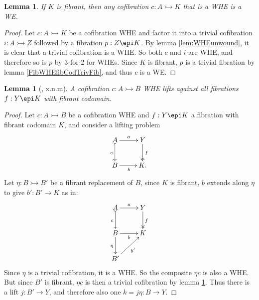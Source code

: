 \documentclass[11pt]{article}
\newcommand{\mono}{\ensuremath{\rightarrowtail}}
\newcommand{\ra}{\ensuremath{\rightarrow}}
\newtheorem{lemma}[theorem]{Lemma}
\theoremstyle{remark}
\theoremstyle{definition}
\begin{document}
\begin{lemma}\label{CofWHEfibCodTrivCof}
If $K$ is fibrant, then any cofibration $c : A \mono K$ that is a WHE is a WE.
\end{lemma}
\begin{proof}
Let $c : A \mono K$ be a cofibration WHE and factor it into a trivial cofibration $i : A\mono Z$ followed by a fibration $p: Z\epi K$.  By lemma \ref{lem:WHEunwound}, it is clear that a trivial cofibration is a WHE.  So both 
$c$ and $i$ are WHE, and therefore so is $p$ by 3-for-2 for WHEs.   Since $K$ is fibrant, $p$ is a trivial fibration by lemma \ref{FibWHEfibCodTrivFib}, and thus $c$ is a WE.  
\end{proof}

\begin{lemma}[\cite{Cisinski:??}, x.n.m]\label{lemma:CofWHEiffFibLift}
A cofibration $ c : A \mono B$ WHE lifts against all fibrations $f : Y\epi K$ with fibrant codomain.
\end{lemma}
%
\begin{proof}
Let $c : A\mono B$ be a cofibration WHE and  $f : Y\epi K$ a fibration with fibrant codomain $K$, and consider a lifting problem
\begin{equation*}%
\xymatrix{
A \ar@{>->}[d]_{c} \ar[r]^-{a}  & Y \ar@{>>}[d]^{f} \\
B \ar[r]_{b} &  K.
}
\end{equation*}
Let $\eta : B\mono B'$ be a fibrant replacement of $B$, since $K$ is fibrant, $b$ extends along $\eta$ to give $b' : B'\ra K$ as in:   
\begin{equation*}%
\xymatrix{
A \ar@{>->}[d]_{c} \ar[r]^-{a}  & Y \ar@{>>}[d]^{f} \\
B \ar[r]_{b} \ar[d]_\eta &  K\\
B' \ar[ru]_{b'} & 
}
\end{equation*}
Since $\eta$ is a trivial cofibration, it is a WHE. So the composite $\eta c$ is also a WHE.  But since $B'$ is fibrant, $\eta c$ is then a trivial cofibration by lemma \ref{CofWHEfibCodTrivCof}.  Thus there is a lift $j : B'\ra Y$, and therefore also one $k = j\eta : B\ra Y$. 
%
\end{proof}
\end{document}
